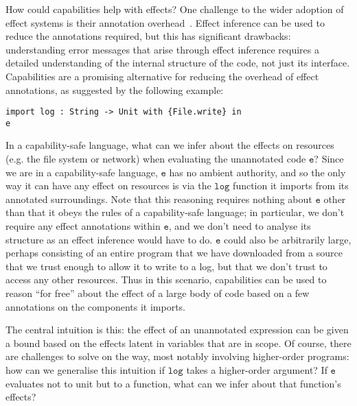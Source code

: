 \documentclass[sigplan,10pt]{acmart}\settopmatter{}
\newcommand{\kwat}[1]{$\kwa{#1}$}
\newcommand{\kwa}[1]{\mathtt{#1}}
\newcommand{\epscalc}{\kwa{CC}}
\begin{document}
How could capabilities help with effects?
One challenge to the wider adoption of effect systems is their annotation overhead~\cite{rytz12}.
Effect inference can be used to reduce the annotations required, but this has significant drawbacks: understanding error messages that arise through effect inference requires a detailed understanding of the internal structure of the code, not just its interface.
Capabilities are a promising alternative for reducing the overhead of effect annotations, as suggested by the following example:

\begin{lstlisting}
import log : String -> Unit with {File.write} in
e
\end{lstlisting}

In a capability-safe language, what can we infer about the effects on resources (e.g. the file system or network) when evaluating the unannotated code \kwat{e}?
Since we are in a capability-safe language, \kwat{e} has no ambient authority, and so the only way it can have any effect on resources is via the \kwat{log} function it imports from its annotated surroundings.
Note that this reasoning requires nothing about \kwat{e} other than that it obeys the rules of a capability-safe language; in particular, we don't require any effect annotations within \kwat{e}, and we don't need to analyse its structure as an effect inference would have to do.
\kwat{e} could also be arbitrarily large, perhaps consisting of an entire program that we have downloaded from a source that we trust enough to allow it to write to a log, but that we don't trust to access any other resources.
Thus in this scenario, capabilities can be used to reason ``for free'' about the effect of a large body of code based on a few annotations on the components it imports.

The central intuition is this: the effect of an unannotated expression can be given a bound based on the effects latent in variables that are in scope.
Of course, there are challenges to solve on the way, most notably involving higher-order programs: how can we generalise this intuition if \kwat{log} takes a higher-order argument?
If \kwat{e} evaluates not to unit but to a function, what can we infer about that function's effects?

%
\end{document}

